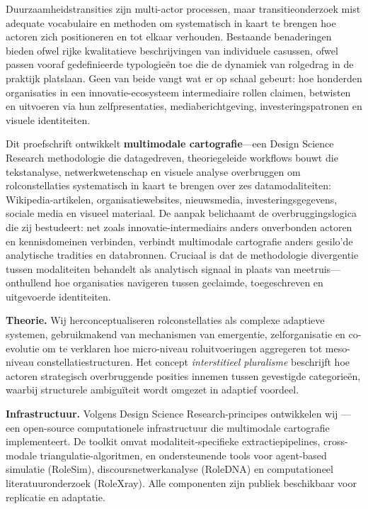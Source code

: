 \documentclass[../main.tex]{subfiles}
\begin{document}
Duurzaamheidstransities zijn multi-actor processen, maar transitieonderzoek mist adequate vocabulaire en methoden om systematisch in kaart te brengen hoe actoren zich positioneren en tot elkaar verhouden. Bestaande benaderingen bieden ofwel rijke kwalitatieve beschrijvingen van individuele casussen, ofwel passen vooraf gedefinieerde typologieën toe die de dynamiek van rolgedrag in de praktijk platslaan. Geen van beide vangt wat er op schaal gebeurt: hoe honderden organisaties in een innovatie-ecosysteem intermediaire rollen claimen, betwisten en uitvoeren via hun zelfpresentaties, mediaberichtgeving, investeringspatronen en visuele identiteiten.

Dit proefschrift ontwikkelt \textbf{multimodale cartografie}---een Design Science Research methodologie die datagedreven, theoriegeleide workflows bouwt die tekstanalyse, netwerkwetenschap en visuele analyse overbruggen om rolconstellaties systematisch in kaart te brengen over zes datamodaliteiten: Wikipedia-artikelen, organisatiewebsites, nieuwsmedia, investeringsgegevens, sociale media en visueel materiaal. De aanpak belichaamt de overbruggingslogica die zij bestudeert: net zoals innovatie-intermediairs anders onverbonden actoren en kennisdomeinen verbinden, verbindt multimodale cartografie anders gesilo'de analytische tradities en databronnen. Cruciaal is dat de methodologie divergentie tussen modaliteiten behandelt als analytisch signaal in plaats van meetruis---onthullend hoe organisaties navigeren tussen geclaimde, toegeschreven en uitgevoerde identiteiten.

\textbf{Theorie.} Wij herconceptualiseren rolconstellaties als complexe adaptieve systemen, gebruikmakend van mechanismen van emergentie, zelforganisatie en co-evolutie om te verklaren hoe micro-niveau roluitvoeringen aggregeren tot meso-niveau constellatiestructuren. Het concept \textit{interstitieel pluralisme} beschrijft hoe actoren strategisch overbruggende posities innemen tussen gevestigde categorieën, waarbij structurele ambiguïteit wordt omgezet in adaptief voordeel.

\textbf{Infrastructuur.} Volgens Design Science Research-principes ontwikkelen wij \RoleBox---een open-source computationele infrastructuur die multimodale cartografie implementeert. De toolkit omvat modaliteit-specifieke extractiepipelines, cross-modale triangulatie-algoritmen, en ondersteunende tools voor agent-based simulatie (RoleSim), discoursnetwerkanalyse (RoleDNA) en computationeel literatuuronderzoek (RoleXray). Alle componenten zijn publiek beschikbaar voor replicatie en adaptatie.
\end{document}
